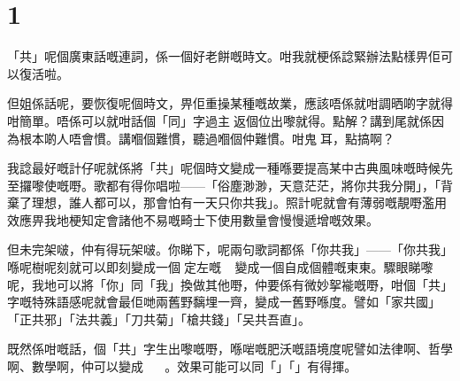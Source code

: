 \chapter{1}

「共」呢個廣東話嘅連詞，係一個好老餅嘅時文。咁我就梗係諗緊辦法點樣畀佢可以復活啦。

但姐係話呢，要恢復呢個時文，畀佢重操某種嘅故業，應該唔係就咁調晒啲字就得咁簡單。唔係可以就咁話個「同」字過主返個位出嚟就得。點解？講到尾就係因為根本啲人唔會慣。講嗰個難慣，聽過嗰個仲難慣。咁鬼󱱹耳，點搞啊？

我諗最好嘅計仔呢就係將「共」呢個時文變成一種喺要提高某中古典風味嘅時候先至攞嚟使嘅嘢。歌都有得你唱啦——「俗塵渺渺，天意茫茫，將你共我分開」，「背棄了理想，誰人都可以，那會怕有一天只你共我」。照計呢就會有薄弱嘅靚嘢濫用效應畀我地梗知定會諸他不易嘅畸士下使用數量會慢慢遞增嘅效果。

但未完架啵，仲有得玩架啵。你睇下，呢兩句歌詞都係「你共我」——「你共我」喺呢樹呢刻就可以即刻變成一個定左嘅，變成一個自成個體嘅東東。驟眼睇嚟呢，我地可以將「你」同「我」換做其他嘢，仲要係有微妙挐褦嘅嘢，咁個「共」字嘅特殊語感呢就會最佢哋兩舊野黐埋一齊，變成一舊野喺度。譬如「家共國」「正共邪」「法共義」「刀共菊」「槍共錢」「㕦共吾直」。

既然係咁嘅話，個「共」字生出嚟嘅嘢，喺啱嘅肥沃嘅語境度呢譬如法律啊、哲學啊、數學啊，仲可以變成 。效果可能可以同「」「」有得揮。







